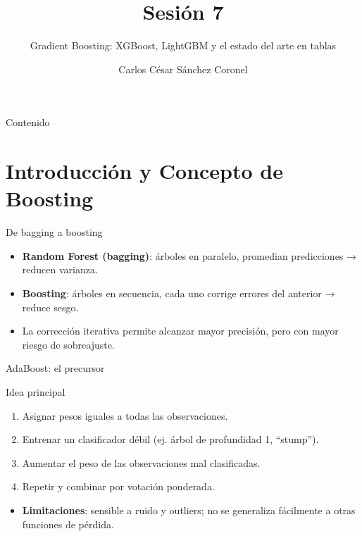 \documentclass[aspectratio=169, 10pt, xcolor=table]{beamer}
\title[SESIÓN 7]{\textbf{Sesión 7}}
\subtitle{Gradient Boosting: XGBoost, LightGBM y el estado del arte en tablas}
\author[Prof. C. Sánchez]{Carlos César Sánchez Coronel}
\institute{\textbf{MACHINE LEARNING}}
\date{}
\begin{document}
\begin{frame}
    \titlepage
\end{frame}

\begin{frame}{Contenido}
    \tableofcontents
\end{frame}

\section{Introducción y Concepto de Boosting}

\begin{frame}{De bagging a boosting}
    \begin{itemize}
        \item \textbf{Random Forest (bagging)}: árboles en paralelo, promedian predicciones → reducen varianza.
        \item \textbf{Boosting}: árboles en secuencia, cada uno corrige errores del anterior → reduce sesgo.
        \item La corrección iterativa permite alcanzar mayor precisión, pero con mayor riesgo de sobreajuste.
    \end{itemize}
\end{frame}

\begin{frame}{AdaBoost: el precursor}
    \begin{block}{Idea principal}
        \begin{enumerate}
            \item Asignar pesos iguales a todas las observaciones.
            \item Entrenar un clasificador débil (ej. árbol de profundidad 1, ``stump'').
            \item Aumentar el peso de las observaciones mal clasificadas.
            \item Repetir y combinar por votación ponderada.
        \end{enumerate}
    \end{block}
    \begin{itemize}
        \item \textbf{Limitaciones}: sensible a ruido y outliers; no se generaliza fácilmente a otras funciones de pérdida.
    \end{itemize}
\end{frame}
\end{document}
